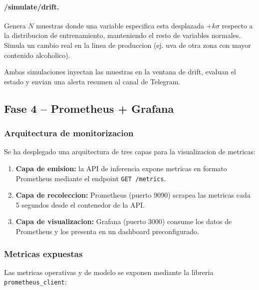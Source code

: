 \paragraph{/simulate/drift.} Genera $N$ muestras donde una variable especifica esta desplazada $+k\sigma$ respecto a la distribucion de entrenamiento, manteniendo el resto de variables normales. Simula un cambio real en la linea de produccion (ej. uva de otra zona con mayor contenido alcoholico).

Ambas simulaciones inyectan las muestras en la ventana de drift, evaluan el estado y envian una alerta resumen al canal de Telegram.

\subsection{Fase 4 -- Prometheus + Grafana}

\subsubsection{Arquitectura de monitorizacion}

Se ha desplegado una arquitectura de tres capas para la visualizacion de metricas:

\begin{enumerate}
    \item \textbf{Capa de emision:} la API de inferencia expone metricas en formato Prometheus mediante el endpoint \texttt{GET /metrics}.
    \item \textbf{Capa de recoleccion:} Prometheus (puerto 9090) scrapea las metricas cada 5 segundos desde el contenedor de la API.
    \item \textbf{Capa de visualizacion:} Grafana (puerto 3000) consume los datos de Prometheus y los presenta en un dashboard preconfigurado.
\end{enumerate}

\subsubsection{Metricas expuestas}

Las metricas operativas y de modelo se exponen mediante la libreria \texttt{prometheus\_client}:

